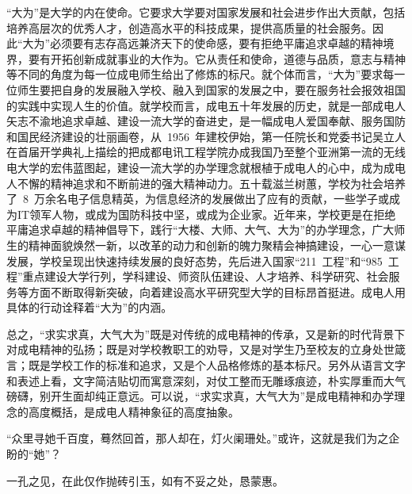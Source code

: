 	“大为”是大学的内在使命。它要求大学要对国家发展和社会进步作出大贡献，包括培养高层次的优秀人才，创造高水平的科技成果，提供高质量的社会服务。因此“大为”必须要有志存高远兼济天下的使命感，要有拒绝平庸追求卓越的精神境界，要有开拓创新成就事业的大作为。它从责任和使命，道德与品质，意志与精神等不同的角度为每一位成电师生给出了修炼的标尺。就个体而言，“大为”要求每一位师生要把自身的发展融入学校、融入到国家的发展之中，要在服务社会报效祖国的实践中实现人生的价值。就学校而言，成电五十年发展的历史，就是一部成电人矢志不渝地追求卓越、建设一流大学的奋进史，是一幅成电人爱国奉献、服务国防和国民经济建设的壮丽画卷，从~1956~年建校伊始，第一任院长和党委书记吴立人在首届开学典礼上描绘的把成都电讯工程学院办成我国乃至整个亚洲第一流的无线电大学的宏伟蓝图起，建设一流大学的办学理念就根植于成电人的心中，成为成电人不懈的精神追求和不断前进的强大精神动力。五十载滋兰树蕙，学校为社会培养了~8~万余名电子信息精英，为信息经济的发展做出了应有的贡献，一些学子或成为IT领军人物，或成为国防科技中坚，或成为企业家。近年来，学校更是在拒绝平庸追求卓越的精神倡导下，践行“大楼、大师、大气、大为”的办学理念，广大师生的精神面貌焕然一新，以改革的动力和创新的魄力聚精会神搞建设，一心一意谋发展，学校呈现出快速持续发展的良好态势，先后进入国家“211~工程”和“985~工程”重点建设大学行列，学科建设、师资队伍建设、人才培养、科学研究、社会服务等方面不断取得新突破，向着建设高水平研究型大学的目标昂首挺进。成电人用具体的行动诠释着“大为”的内涵。

	总之，“求实求真，大气大为”既是对传统的成电精神的传承，又是新的时代背景下对成电精神的弘扬；既是对学校教职工的劝导，又是对学生乃至校友的立身处世箴言；既是学校工作的标准和追求，又是个人品格修炼的基本标尺。另外从语言文字和表述上看，文字简洁贴切而寓意深刻，对仗工整而无雕琢痕迹，朴实厚重而大气磅礴，别开生面却纯正意远。可以说，“求实求真，大气大为”是成电精神和办学理念的高度概括，是成电人精神象征的高度抽象。

	“众里寻她千百度，蓦然回首，那人却在，灯火阑珊处。”或许，这就是我们为之企盼的“她”？

	一孔之见，在此仅作抛砖引玉，如有不妥之处，恳蒙惠。